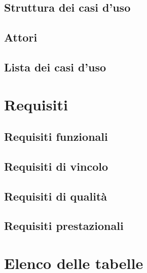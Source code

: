\documentclass[a4paper, 11pt]{article}
\begin{document}
\subsection{Struttura dei casi d'uso}
\subsection{Attori}
\subsection{Lista dei casi d'uso}

\pagebreak

\section{Requisiti}
\subsection{Requisiti funzionali}
\subsection{Requisiti di vincolo}
\subsection{Requisiti di qualità}
\subsection{Requisiti prestazionali}

\pagebreak

\section{Elenco delle tabelle}
\end{document}
